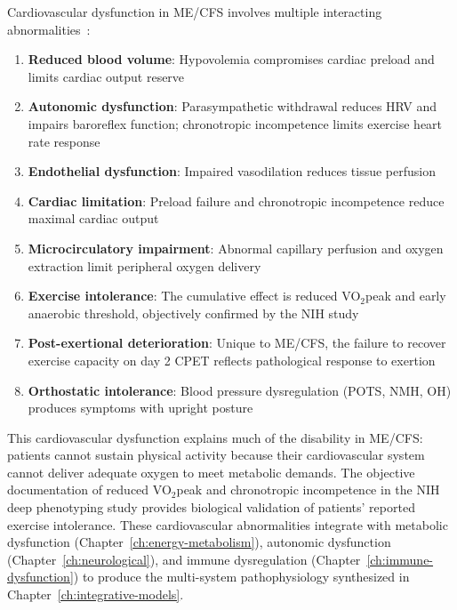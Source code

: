 Cardiovascular dysfunction in ME/CFS involves multiple interacting abnormalities~\cite{walitt2024deep}:

\begin{enumerate}
    \item \textbf{Reduced blood volume}: Hypovolemia compromises cardiac preload and limits cardiac output reserve

    \item \textbf{Autonomic dysfunction}: Parasympathetic withdrawal reduces HRV and impairs baroreflex function; chronotropic incompetence limits exercise heart rate response

    \item \textbf{Endothelial dysfunction}: Impaired vasodilation reduces tissue perfusion

    \item \textbf{Cardiac limitation}: Preload failure and chronotropic incompetence reduce maximal cardiac output

    \item \textbf{Microcirculatory impairment}: Abnormal capillary perfusion and oxygen extraction limit peripheral oxygen delivery

    \item \textbf{Exercise intolerance}: The cumulative effect is reduced VO$_2$peak and early anaerobic threshold, objectively confirmed by the NIH study

    \item \textbf{Post-exertional deterioration}: Unique to ME/CFS, the failure to recover exercise capacity on day 2 CPET reflects pathological response to exertion

    \item \textbf{Orthostatic intolerance}: Blood pressure dysregulation (POTS, NMH, OH) produces symptoms with upright posture
\end{enumerate}

This cardiovascular dysfunction explains much of the disability in ME/CFS: patients cannot sustain physical activity because their cardiovascular system cannot deliver adequate oxygen to meet metabolic demands. The objective documentation of reduced VO$_2$peak and chronotropic incompetence in the NIH deep phenotyping study provides biological validation of patients' reported exercise intolerance. These cardiovascular abnormalities integrate with metabolic dysfunction (Chapter~\ref{ch:energy-metabolism}), autonomic dysfunction (Chapter~\ref{ch:neurological}), and immune dysregulation (Chapter~\ref{ch:immune-dysfunction}) to produce the multi-system pathophysiology synthesized in Chapter~\ref{ch:integrative-models}.

